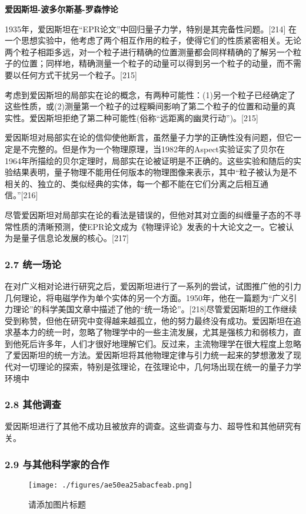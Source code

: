 \textbf{爱因斯坦-波多尔斯基-罗森悖论}

1935年，爱因斯坦在“EPR论文”中回归量子力学，特别是其完备性问题。[214] 在一个思想实验中，他考虑了两个相互作用的粒子，使得它们的性质紧密相关。无论两个粒子相距多远，对一个粒子进行精确的位置测量都会同样精确的了解另一个粒子的位置；同样地，精确测量一个粒子的动量可以得到另一个粒子的动量，而不需要以任何方式干扰另一个粒子。[215]

考虑到爱因斯坦的局部实在论的概念，有两种可能性：(1)另一个粒子已经确定了这些性质，或(2)测量第一个粒子的过程瞬间影响了第二个粒子的位置和动量的真实性。爱因斯坦拒绝了第二种可能性(俗称“远距离的幽灵行动”)。[215]

爱因斯坦对局部实在论的信仰使他断言，虽然量子力学的正确性没有问题，但它一定是不完整的。但是作为一个物理原理，当1982年的Aspect实验证实了贝尔在1964年所描绘的贝尔定理时，局部实在论被证明是不正确的。这些实验和随后的实验结果表明，量子物理不能用任何版本的物理图像来表示，其中“粒子被认为是不相关的、独立的、类似经典的实体，每一个都不能在它们分离之后相互通信。”[216]

尽管爱因斯坦对局部实在论的看法是错误的，但他对其对立面的纠缠量子态的不寻常性质的清晰预测，使EPR论文成为《物理评论》发表的十大论文之一。它被认为是量子信息论发展的核心。[217]

\subsubsection{2.7 统一场论}
在对广义相对论进行研究之后，爱因斯坦进行了一系列的尝试，试图推广他的引力几何理论，将电磁学作为单个实体的另一个方面。1950年，他在一篇题为“广义引力理论”的科学美国文章中描述了他的“统一场论”。[218]尽管爱因斯坦的工作继续受到称赞，但他在研究中变得越来越孤立，他的努力最终没有成功。爱因斯坦在追求基本力的统一时，忽略了物理学中的一些主流发展，尤其是强核力和弱核力，直到他死后许多年，人们才很好地理解它们。反过来，主流物理学在很大程度上忽略了爱因斯坦的统一方法。爱因斯坦将其他物理定律与引力统一起来的梦想激发了现代对一切理论的探索，特别是弦理论，在弦理论中，几何场出现在统一的量子力学环境中

\subsubsection{2.8 其他调查}
爱因斯坦进行了其他不成功且被放弃的调查。这些调查与力、超导性和其他研究有关。

\subsubsection{2.9 与其他科学家的合作}
\begin{figure}[ht]
\centering
\texttt{[image: ./figures/ae50ea25abacfeab.png]}
\caption{请添加图片标题} \label{fig_AYST_23}
\end{figure}
